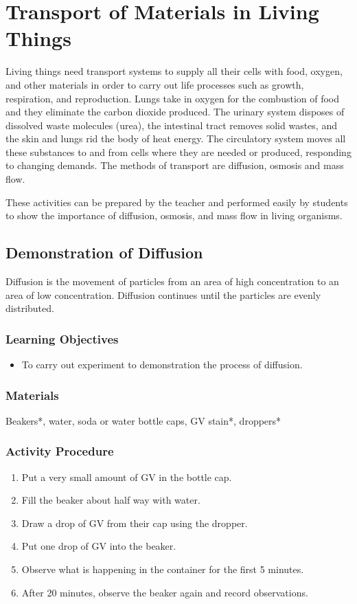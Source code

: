 \section{Transport of Materials in Living Things}
Living things need transport systems to supply all their cells with food, oxygen, and other materials in order to carry out life processes such as growth, respiration, and reproduction. Lungs take in oxygen for the combustion of food and they eliminate the carbon dioxide produced. The urinary system disposes of dissolved waste molecules (urea), the intestinal tract removes solid wastes, and the skin and lungs rid the body of heat energy. The circulatory system moves all these substances to and from cells where they are needed or produced, responding to changing demands. The methods of transport are diffusion, osmosis and mass flow.

These activities can be prepared by the teacher and performed easily by students to show the importance of diffusion, osmosis, and mass flow in living organisms.  

\subsection{Demonstration of Diffusion}

Diffusion is the movement of particles from an area of high concentration to an area of low concentration. Diffusion continues until the particles are evenly distributed.

\subsubsection*{Learning Objectives}
\begin{itemize}
\item{To carry out experiment to demonstration the process of diffusion.}
\end{itemize}

\subsubsection*{Materials}
Beakers*, water, soda or water bottle caps, GV stain*, droppers*

\subsubsection*{Activity Procedure}
\begin{enumerate}
\item{Put a very small amount of GV in the bottle cap.}
\item{Fill the beaker about half way with water.}
\item{Draw a drop of GV from their cap using the dropper.}
\item{Put one drop of GV into the beaker.}
\item{Observe what is happening in the container for the first 5 minutes.}
\item{After 20 minutes, observe the beaker again and record observations.}
\end{enumerate}


